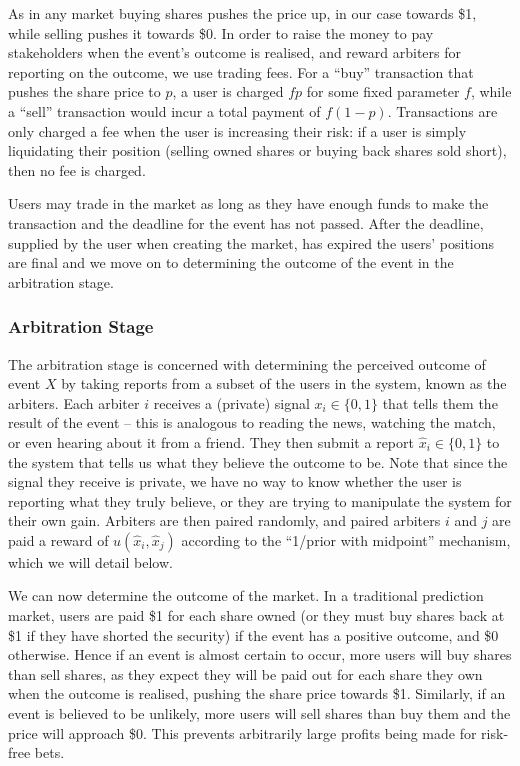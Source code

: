 \documentclass[10pt,a4paper]{article}
\theoremstyle{plain}
\theoremstyle{definition}
\begin{document}
As in any market buying shares pushes the price up, in our case towards \$1,
while selling pushes it towards \$0. In order to raise the money to pay
stakeholders when the event's outcome is realised, and reward arbiters for
reporting on the outcome, we use trading fees. For a ``buy'' transaction that
pushes the share price to $p$, a user is charged $fp$ for some fixed parameter
$f$, while a ``sell'' transaction would incur a total payment of $f(1-p)$.
Transactions are only charged a fee when the user is increasing their risk: if
a user is simply liquidating their position (selling owned shares or buying
back shares sold short), then no fee is charged.

Users may trade in the market as long as they have enough funds to make the
transaction and the deadline for the event has not passed. After the deadline,
supplied by the user when creating the market, has expired the users' positions
are final and we move on to determining the outcome of the event in the
arbitration stage.

\subsubsection{Arbitration Stage}

The arbitration stage is concerned with determining the perceived outcome of
event $X$ by taking reports from a subset of the users in the system, known as
the arbiters. Each arbiter $i$ receives a (private) signal $x_i \in \{0,1\}$
that tells them the result of the event -- this is analogous to reading the
news, watching the match, or even hearing about it from a friend. They then
submit a report $\hat{x}_i \in \{0,1\}$ to the system that tells us what they
believe the outcome to be. Note that since the signal they receive is private,
we have no way to know whether the user is reporting what they truly believe,
or they are trying to manipulate the system for their own gain. Arbiters are
then paired randomly, and paired arbiters $i$ and $j$ are paid a reward of
$u(\hat{x}_i, \hat{x}_j)$ according to the ``1/prior with midpoint'' mechanism,
which we will detail below.

We can now determine the outcome of the market. In a traditional prediction
market, users are paid \$1 for each share owned (or they must buy shares back
at \$1 if they have shorted the security) if the event has a positive outcome,
and \$0 otherwise. Hence if an event is almost certain to occur, more users
will buy shares than sell shares, as they expect they will be paid out for each
share they own when the outcome is realised, pushing the share price towards
\$1. Similarly, if an event is believed to be unlikely, more users will sell
shares than buy them and the price will approach \$0. This prevents arbitrarily
large profits being made for risk-free bets.
\end{document}
